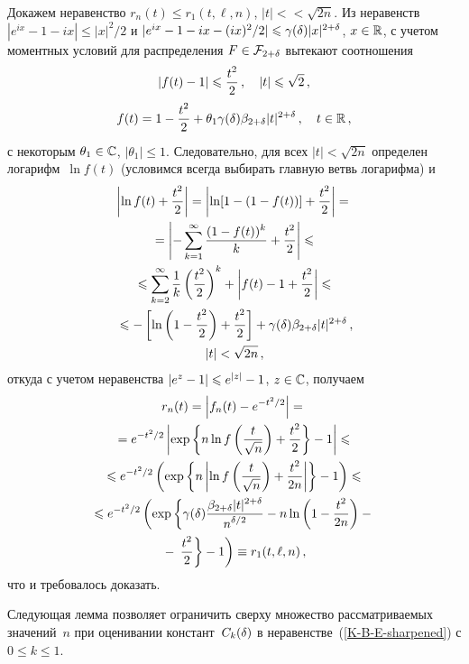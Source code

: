 \begin{multicols}{2}
Докажем неравенство $r_n(t)\le r_1(t,\ell,n)$, $|t|<$\linebreak $<\sqrt{2n}$. Из
неравенств $|e^{ix}-1-ix|\le|x|^2/2$ и $|e^{ix}-1-ix-(ix)^2/2|\le
\gd|x|^{2+\d}$, $x\in\R$, с учетом моментных условий для
распределения $F\in\F_{2+\d}$ вытекают соотношения
\begin{gather*}
|f(t)-1|\le\fr{t^2}{2}\,,\quad|t|\le\sqrt2\,,\\
f(t)=1-\fr{t^2}2 + \theta_1 \gd \bet|t|^{2+\d}\,,\quad t\in\R\,,
\end{gather*}
с некоторым $\theta_1\in\C$, $|\theta_1|\le1$. Следовательно, для
всех $|t|<\sqrt{2n}$ определен логарифм~$\ln f(t)$ (условимся всегда
выбирать главную ветвь логарифма) и
\begin{multline*}
\abs{\ln f(t)+\fr{t^2}2}=\abs{\ln[1-(1-f(t))]+\fr{t^2}2}={}\\
{}=
\left|-\sum_{k=1}^\infty\fr{(1-f(t))^k}k+\fr{t^2}2\right|\le{}\\
{}\le
\sum_{k=2}^\infty\fr{1}{k}\left(\fr{t^2}2\right)^k+
\abs{f(t)-1+\fr{t^2}2}\le{}\\
{}\le  -\left[\ln\left(1-\fr{t^2}{2}\right)
+\fr{t^2}2\right]+\gd\bet|t|^{2+\d}\,,\\ |t|<\sqrt{2n}\,,
\end{multline*}
откуда с учетом неравенства $\abs{e^z-1}\le e^{|z|}-1$, $z\in\C$,
получаем
\begin{multline*}
r_n(t)=\abs{f_n(t)-e^{-t^2/2}}={}\\
{}=e^{-t^2/2} \left|\exp\left\{n\ln
f\left(\fr{t}{\sqrt n}\right)+\fr{t^2}2\right\}- 1\right|\le{}
\\
{}\le e^{-t^2/2} \left(\exp\left\{n\left|\ln f\left(\fr{t}{\sqrt
n}\right)+\fr{t^2}{2n}\right|\right\}-1\right)\le{}
\\
{}\le e^{-t^2/2} \left(\exp\left\{\gd \fr{\bet|t|^{2+\d}}{n^{\d/2}}
-n\ln \left(1-\fr{t^2}{2n}\right)-{}\right.\right.\\
{}-\left.\left.\fr{t^2}{2}\right\}-1\right)\equiv
r_1(t,\ell,n)\,,
\end{multline*}
что и требовалось доказать.

\medskip

Следующая лемма позволяет ограничить сверху множество
рассматриваемых значений~$n$ при оценивании констант~$\exlowk(\d)$ в
неравенстве~(\ref{K-B-E-sharpened}) с $0\le k\le 1$.

\medskip


\end{multicols}
